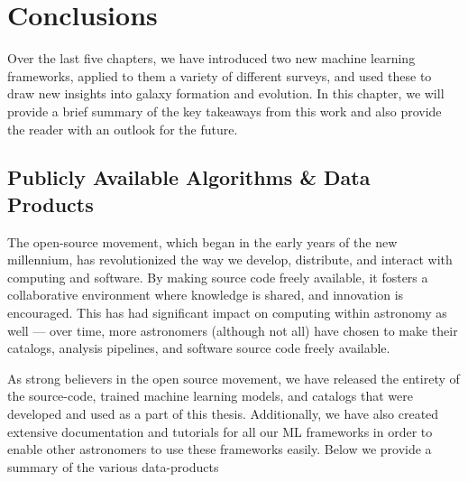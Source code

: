 \chapter{Conclusions} \label{chap:conc}

Over the last five chapters, we have introduced two new machine learning frameworks, applied to them a variety of different surveys, and used these to draw new insights into galaxy formation and evolution. In this chapter, we will provide a brief summary of the key takeaways from this work and also provide the reader with an outlook for the future.

\section{Publicly Available Algorithms \& Data Products} \label{sec_conc:public_products}

The open-source movement, which began in the early years of the new millennium, has revolutionized the way we develop, distribute, and interact with computing and software. By making source code freely available, it fosters a collaborative environment where knowledge is shared, and innovation is encouraged. This has had significant impact on computing within astronomy as well --- over time, more astronomers (although not all) have chosen to make their catalogs, analysis pipelines, and software source code freely available. 

As strong believers in the open source movement, we have released the entirety of the source-code, trained machine learning models, and catalogs that were developed and used as a part of this thesis. Additionally, we have also created extensive documentation and tutorials for all our ML frameworks in order to enable other astronomers to use these frameworks easily. Below we provide a summary of the various data-products

